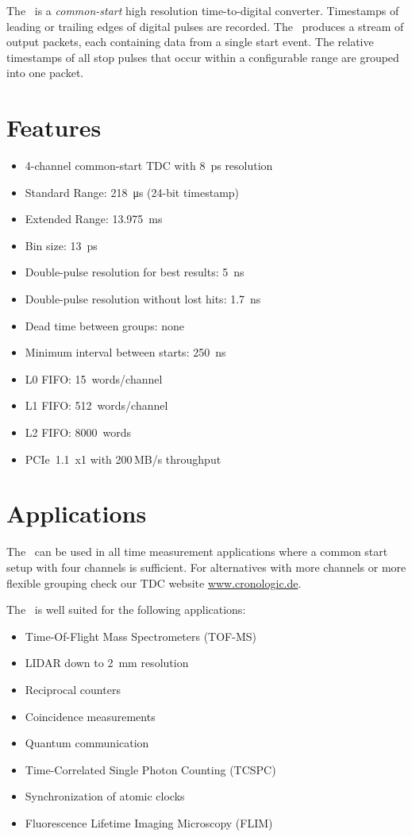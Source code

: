The \deviceName\ is a \emph{common-start} high resolution time-to-digital
converter.  Timestamps of leading or trailing edges of digital pulses are
recorded.  The \deviceName\ produces a stream of output packets, each
containing data from a single start event.  The relative timestamps of all
stop pulses that occur within a configurable range are grouped into one packet.

\section{Features}
	\begin{itemize}
		\item 4-channel common-start TDC with 8~ps resolution
		\item Standard Range: \SI{218}{\micro\second} (24-bit timestamp)
		\item Extended Range: \SI{13.975}{\milli\second}
		\item Bin size: \SI{13}{\pico\second}
		\item Double-pulse resolution for best results: \SI{5}{\nano\second}
		\item Double-pulse resolution without lost hits: \SI{1.7}{\nano\second}
		\item Dead time between groups: none
		\item Minimum interval between starts: \SI{250}{\nano\second}
		\item L0 FIFO: 15~words/channel
		\item L1 FIFO: 512~words/channel
		\item L2 FIFO: 8000~words
		\item PCIe~1.1~x1 with 200\,MB/s throughput
	\end{itemize} 

\clearpage
\section{Applications}
The \deviceName\ can be used in all time measurement applications where a
common start setup with four channels is sufficient.  For alternatives with
more channels or more flexible grouping check our TDC website
\href{https://www.cronologic.de/produkte/products-overview#tdcdata}{www.cronologic.de}.

The \deviceName\ is well suited for the following applications:
\begin{itemize}
	\item Time-Of-Flight Mass Spectrometers (TOF-MS)
	\item LIDAR down to \SI{2}{\milli\meter} resolution
	\item Reciprocal counters
	\item Coincidence measurements
	\item Quantum communication
	\item Time-Correlated Single Photon Counting (TCSPC)
	\item Synchronization of atomic clocks
	\item Fluorescence Lifetime Imaging Microscopy (FLIM)
\end{itemize} 